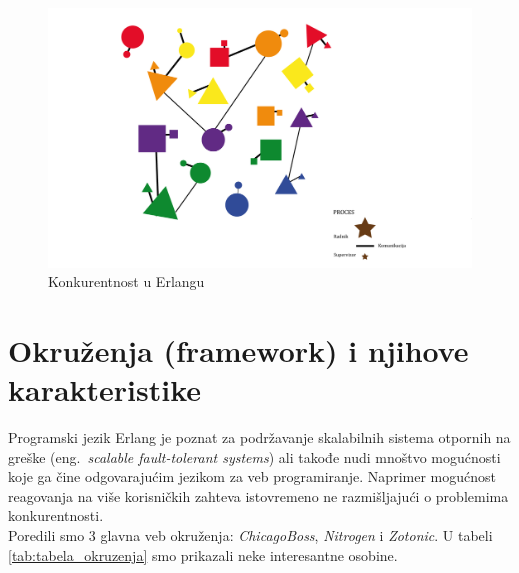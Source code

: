 \documentclass[a4paper]{article}
\begin{document}
{\begin{figure}[h!]
\begin{center}
\includegraphics[scale=0.5]{actor_model.png}
\end{center}
\caption{Konkurentnost u Erlangu}
\label{fig:actor_model}
\end{figure}

\section{Okruženja (framework) i njihove karakteristike}
\label{sec:okruzenja}
Programski jezik Erlang je poznat za podržavanje skalabilnih sistema otpornih na greške (eng.~{\em scalable fault-tolerant systems}) ali takođe nudi mnoštvo mogućnosti koje ga čine odgovarajućim jezikom za veb programiranje. Naprimer mogućnost reagovanja na više korisničkih zahteva istovremeno ne razmišljajući o problemima konkurentnosti.\\

Poredili smo 3 glavna veb okruženja: {\em ChicagoBoss}, {\em Nitrogen} i {\em Zotonic}. U tabeli \ref{tab:tabela_okruzenja} smo prikazali neke interesantne osobine.\\

}
\end{document}
